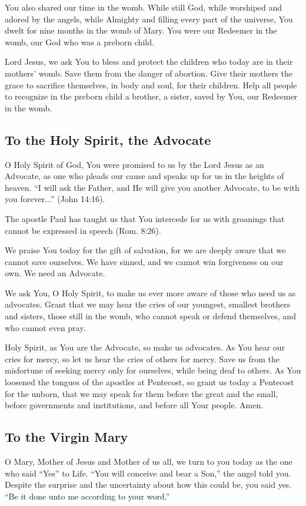 \documentclass[12pt]{article}
\newcommand{\prayertitle}[1]{\subsection{#1}}
\begin{document}
You also shared our time in the womb. While still God, while worshiped and adored by the angels, while Almighty and filling every part of the universe, You dwelt for nine months in the womb of Mary.
You were our Redeemer in the womb, our God who was a preborn child.

Lord Jesus, we ask You to bless and protect the children who today are in their mothers' womb.
Save them from the danger of abortion.
Give their mothers the grace to sacrifice themselves, in body and soul, for their children.
Help all people to recognize in the preborn child a brother, a sister, saved by You, our Redeemer in the womb.

\prayertitle{To the Holy Spirit, the Advocate}
O Holy Spirit of God, You were promised to us by the Lord Jesus as an Advocate, as one who pleads our cause and speaks up for us in the heights of heaven.
``I will ask the Father, and He will give you another Advocate, to be with you forever...'' (John 14:16).

The apostle Paul has taught us that You intercede for us with groanings that cannot be expressed in speech (Rom. 8:26).

We praise You today for the gift of salvation, for we are deeply aware that we cannot save ourselves.
We have sinned, and we cannot win forgiveness on our own.
We need an Advocate.

We ask You, O Holy Spirit, to make us ever more aware of those who need us as advocates.
Grant that we may hear the cries of our youngest, smallest brothers and sisters, those still in the womb, who cannot speak or defend themselves, and who cannot even pray.

Holy Spirit, as You are the Advocate, so make us advocates.
As You hear our cries for mercy, so let us hear the cries of others for mercy.
Save us from the misfortune of seeking mercy only for ourselves, while being deaf to others.
As You loosened the tongues of the apostles at Pentecost, so grant us today a Pentecost for the unborn, that we may speak for them before the great and the small, before governments and institutions, and before all Your people.
Amen.

\prayertitle{To the Virgin Mary}
O Mary, Mother of Jesus and Mother of us all, we turn to you today as the one who said ``Yes'' to Life.
``You will conceive and bear a Son,'' the angel told you.
Despite the surprise and the uncertainty about how this could be, you said yes.
``Be it done unto me according to your word.''
\end{document}
